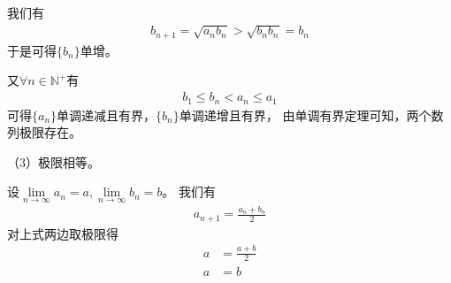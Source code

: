\documentclass{article}
\begin{document}
我们有
\begin{align*}
  b_{n + 1} = \sqrt{a_n b_n} > \sqrt{b_n b_n} = b_n
\end{align*}
于是可得$\{b_n\}$单增。

又$\forall n \in \mathbb{N}^+$有
\begin{align*}
  b_1 \leq b_n < a_n \leq a_1
\end{align*}
可得$\{a_n\}$单调递减且有界，$\{b_n\}$单调递增且有界，
由单调有界定理可知，两个数列极限存在。

（3）极限相等。

设$\lim\limits_{n \to \infty} a_n = a, \lim\limits_{n \to \infty} b_n = b$。
我们有
\begin{align*}
  a_{n + 1} = \frac{a_n + b_n}{2}
\end{align*}
对上式两边取极限得
\begin{align*}
  a & = \frac{a + b}{2} \\
  a & = b
\end{align*}
\end{document}
